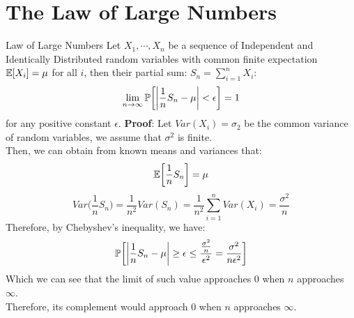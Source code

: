\section{The Law of Large Numbers}
\begin{ln-theorem}{Law of Large Numbers}{}
    Let $X_1, \cdots, X_n$ be a sequence of Independent and Identically Distributed random variables with common finite expectation $\E[X_i] = \mu$ for all $i$, then their partial sum: $S_n = \sum_{i = 1}^n X_i$:
    \[
        \lim_{n \rightarrow \infty} \P \bigg[ \bigg|\frac{1}{n} S_n - \mu \bigg| < \epsilon \bigg] = 1
    \]
    for any positive constant $\epsilon$.
    \tcblower
    \textbf{Proof}:
    Let $Var(X_i) = \sigma_2$ be the common variance of random variables, we assume that $\sigma^2$ is finite. \\
    Then, we can obtain from known means and variances that:
    \[
        \E \bigg[\frac{1}{n} S_n \bigg] = \mu
    \]
    \[
        Var \bigg(\frac{1}{n} S_n \bigg) = \frac{1}{n^2} Var(S_n) = \frac{1}{n^2} \sum_{i = 1}^n Var(X_i) = \frac{\sigma^2}{n}
    \]
    Therefore, by Chebyshev's inequality, we have:
    \[
        \P \bigg[ \bigg|\frac{1}{n} S_n - \mu \bigg| \geq \epsilon \leq \frac{\frac{\sigma^2}{n}}{\epsilon^2} = \frac{\sigma^2}{n\epsilon^2} \bigg]
    \]
    Which we can see that the limit of such value approaches $0$ when $n$ approaches $\infty$. \\
    Therefore, its complement would approach $0$ when $n$ approaches $\infty$.
\end{ln-theorem}
